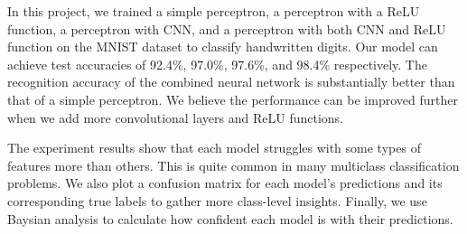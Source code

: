 \documentclass[11pt]{amsart}
\begin{document}
In this project, we trained a simple perceptron, a perceptron with a ReLU function, a perceptron with CNN, and a perceptron with both CNN and ReLU function on the MNIST dataset to classify handwritten digits. Our model can achieve test accuracies of 92.4\%, 97.0\%, 97.6\%, and 98.4\% respectively. The recognition accuracy of the combined neural network is substantially better than that of a simple perceptron. We believe the performance can be improved further when we add more convolutional layers and ReLU functions.

The experiment results show that each model struggles with some types of features more than others. This is quite common in many multiclass classification problems. We also plot a confusion matrix for each model's predictions and its corresponding true labels to gather more class-level insights. Finally, we use Baysian analysis to calculate how confident each model is with their predictions.




\vskip 0.3in
\end{document}
